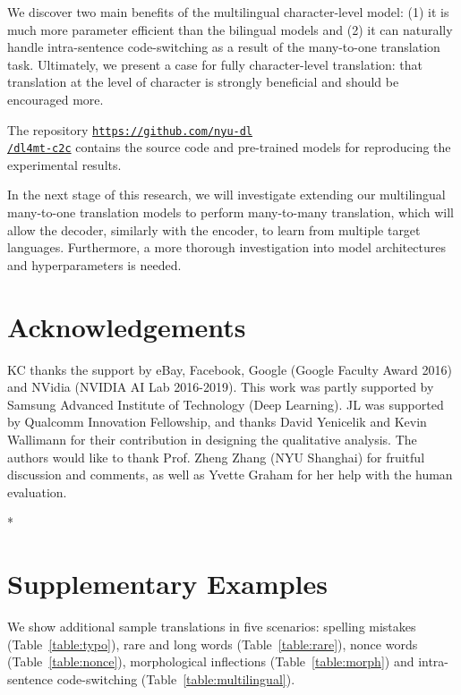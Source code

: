 \documentclass[11pt,letterpaper]{article}
\begin{document}
We discover two main benefits of the multilingual character-level model: (1) it is much more parameter efficient than the bilingual models and (2) it can naturally handle intra-sentence code-switching as a result of the many-to-one translation task. Ultimately, we present a case for fully character-level translation: that translation at the level of character is strongly beneficial and should be encouraged more.

The repository {\tt\small\href{https://github.com/nyu-dl/dl4mt-c2c}{https://github.com/nyu-dl\\/dl4mt-c2c}} contains the source code and pre-trained models for reproducing the experimental results.

In the next stage of this research, we will investigate extending our multilingual many-to-one translation models to perform many-to-many translation, which will allow the decoder, similarly with the encoder, to learn from multiple target languages. Furthermore, a more thorough investigation into model architectures and hyperparameters is needed.

\section*{Acknowledgements}

KC thanks the support by eBay, Facebook, Google (Google Faculty Award 2016) and NVidia (NVIDIA AI Lab 2016-2019). This work was partly supported by Samsung Advanced Institute of Technology (Deep Learning). JL was supported by Qualcomm Innovation Fellowship, and thanks David Yenicelik and Kevin Wallimann for their contribution in designing the qualitative analysis. The authors would like to thank Prof. Zheng Zhang (NYU Shanghai) for fruitful discussion and comments, as well as Yvette Graham for her help with the human evaluation. 




\/*

\appendix

\section{Supplementary Examples}

We show additional sample translations in five scenarios: spelling mistakes (Table~\ref{table:typo}), rare and long words (Table~\ref{table:rare}), nonce words (Table~\ref{table:nonce}), morphological inflections (Table~\ref{table:morph}) and intra-sentence code-switching (Table~\ref{table:multilingual}).
\end{document}
